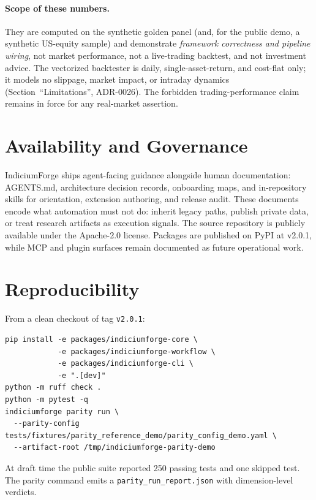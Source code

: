\documentclass[11pt]{article}
\begin{document}
\paragraph*{Scope of these numbers.}
They are computed on the synthetic golden panel (and, for the public demo, a synthetic
US-equity sample) and demonstrate \emph{framework correctness
and pipeline wiring}, not market performance, not a live-trading backtest, and not
investment advice. The vectorized backtester is daily, single-asset-return, and cost-flat
only; it models no slippage, market impact, or intraday dynamics (Section~``Limitations'',
ADR-0026). The forbidden trading-performance claim remains in force for any real-market
assertion.

\section{Availability and Governance}

IndiciumForge ships agent-facing guidance alongside human documentation: AGENTS.md,
architecture decision records, onboarding maps, and in-repository skills for orientation,
extension authoring, and release audit. These documents encode what automation must not do:
inherit legacy paths, publish private data, or treat research artifacts as execution signals.
The source repository is publicly available under the Apache-2.0 license. Packages are
published on PyPI at v2.0.1, while MCP and plugin surfaces remain documented as future operational work.

\section{Reproducibility}
\label{sec:repro}

From a clean checkout of tag \texttt{v2.0.1}:
\begin{verbatim}
pip install -e packages/indiciumforge-core \
            -e packages/indiciumforge-workflow \
            -e packages/indiciumforge-cli \
            -e ".[dev]"
python -m ruff check .
python -m pytest -q
indiciumforge parity run \
  --parity-config tests/fixtures/parity_reference_demo/parity_config_demo.yaml \
  --artifact-root /tmp/indiciumforge-parity-demo
\end{verbatim}
At draft time the public suite reported 250 passing tests and one skipped test. The parity
command emits a \texttt{parity\_run\_report.json} with dimension-level verdicts.
\end{document}
